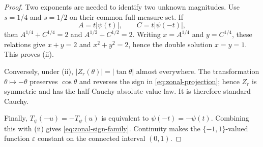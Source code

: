 \documentclass[10pt,a4paper]{amsart}
\begin{document}
\begin{proof}
Two exponents are needed to identify two unknown magnitudes.  Use
\(s=1/4\) and \(s=1/2\) on their common full-measure set.  If
\[
  A=t|\psi(t)|,\qquad C=t|\psi(-t)|,
\]
then \(A^{1/4}+C^{1/4}=2\) and
\(A^{1/2}+C^{1/2}=2\).  Writing \(x=A^{1/4}\) and \(y=C^{1/4}\), these
relations give \(x+y=2\) and \(x^2+y^2=2\), hence the double solution
\(x=y=1\).  This proves \textup{(ii)}.

Conversely, under \textup{(ii)},
\(|Z_r(\theta)|=|\tan\theta|\) almost everywhere.  The transformation
\(\theta\mapsto-\theta\) preserves \(\cos\theta\) and reverses the sign in
\cref{eq:zonal-projection}; hence \(Z_r\) is symmetric and has the
half-Cauchy absolute-value law.  It is therefore standard Cauchy.

Finally, \(T_\psi(-u)=-T_\psi(u)\) is equivalent to
\(\psi(-t)=-\psi(t)\).  Combining this with \textup{(ii)} gives
\cref{eq:zonal-sign-family}.  Continuity makes the
\(\{-1,1\}\)-valued function \(\varepsilon\) constant on the connected
interval \((0,1)\).
\end{proof}
\end{document}
